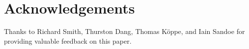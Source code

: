 
\section*{Acknowledgements}
Thanks to  Richard Smith, Thurston Dang, Thomas K\"{o}ppe, and Iain Sandoe for providing valuable feedback on this paper.


\pagebreak
\renewcommand{\bibname}{References}  %






